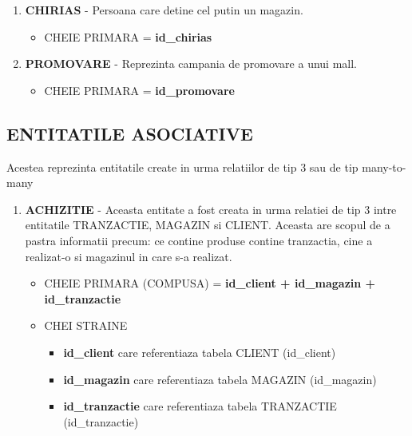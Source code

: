 \begin{enumerate}
    \item \textbf{CHIRIAS}
    - Persoana care detine cel putin un magazin.
    
    \begin{itemize}
        \item CHEIE PRIMARA = \textbf{id\_chirias}      
    \end{itemize}

    \vspace{0.5cm}

    \item \textbf{PROMOVARE}
    - Reprezinta campania de promovare a unui mall. 

    \begin{itemize}
        \item CHEIE PRIMARA = \textbf{id\_promovare}
    \end{itemize}
    
\end{enumerate}


\subsection*{\centering ENTITATILE ASOCIATIVE}

Acestea reprezinta entitatile create in urma relatiilor de tip 3 sau de tip many-to-many


\begin{enumerate}
    \item \textbf{ACHIZITIE}
    - Aceasta entitate a fost creata in urma relatiei de tip 3 intre entitatile TRANZACTIE, MAGAZIN si CLIENT. Aceasta are scopul de a pastra informatii precum: ce contine produse contine tranzactia, cine a realizat-o si magazinul in care s-a realizat.
    
    \begin{itemize}
        \item CHEIE PRIMARA (COMPUSA) = \textbf{id\_client + id\_magazin + id\_tranzactie}      
    
    \item CHEI STRAINE
                            \begin{itemize}
                                \item \textbf{id\_client} care referentiaza tabela CLIENT (id\_client)
                                \item \textbf{id\_magazin} care referentiaza tabela MAGAZIN (id\_magazin)
                                \item \textbf{id\_tranzactie} care referentiaza tabela TRANZACTIE (id\_tranzactie)
                            \end{itemize}
    \end{itemize}
\end{enumerate}
